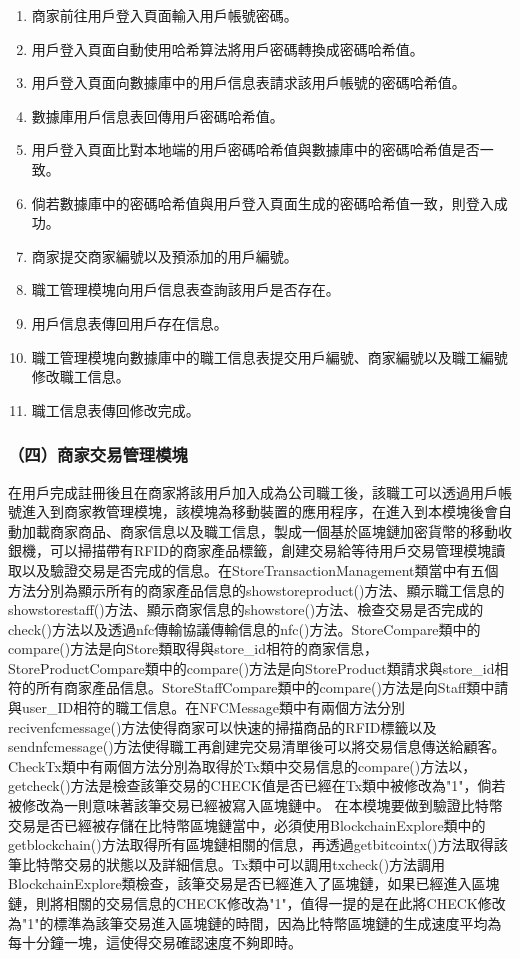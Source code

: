 	\begin{enumerate}
	\item 商家前往用戶登入頁面輸入用戶帳號密碼。
	\item 用戶登入頁面自動使用哈希算法將用戶密碼轉換成密碼哈希值。
	\item 用戶登入頁面向數據庫中的用戶信息表請求該用戶帳號的密碼哈希值。
	\item 數據庫用戶信息表回傳用戶密碼哈希值。
	\item 用戶登入頁面比對本地端的用戶密碼哈希值與數據庫中的密碼哈希值是否一致。
	\item 倘若數據庫中的密碼哈希值與用戶登入頁面生成的密碼哈希值一致，則登入成功。
	\item 商家提交商家編號以及預添加的用戶編號。
	\item 職工管理模塊向用戶信息表查詢該用戶是否存在。
	\item 用戶信息表傳回用戶存在信息。
	\item 職工管理模塊向數據庫中的職工信息表提交用戶編號、商家編號以及職工編號修改職工信息。
	\item 職工信息表傳回修改完成。
	\end{enumerate}

\subsubsection{（四）商家交易管理模塊}
在用戶完成註冊後且在商家將該用戶加入成為公司職工後，該職工可以透過用戶帳號進入到商家教管理模塊，該模塊為移動裝置的應用程序，在進入到本模塊後會自動加載商家商品、商家信息以及職工信息，製成一個基於區塊鏈加密貨幣的移動收銀機，可以掃描帶有RFID的商家產品標籤，創建交易給等待用戶交易管理模塊讀取以及驗證交易是否完成的信息。在StoreTransactionManagement類當中有五個方法分別為顯示所有的商家產品信息的showstoreproduct()方法、顯示職工信息的showstorestaff()方法、顯示商家信息的showstore()方法、檢查交易是否完成的check()方法以及透過nfc傳輸協議傳輸信息的nfc()方法。StoreCompare類中的compare()方法是向Store類取得與store\_id相符的商家信息，StoreProductCompare類中的compare()方法是向StoreProduct類請求與store\_id相符的所有商家產品信息。StoreStaffCompare類中的compare()方法是向Staff類中請與user\_ID相符的職工信息。在NFCMessage類中有兩個方法分別recivenfcmessage()方法使得商家可以快速的掃描商品的RFID標籤以及sendnfcmessage()方法使得職工再創建完交易清單後可以將交易信息傳送給顧客。CheckTx類中有兩個方法分別為取得於Tx類中交易信息的compare()方法以，getcheck()方法是檢查該筆交易的CHECK值是否已經在Tx類中被修改為"1"，倘若被修改為一則意味著該筆交易已經被寫入區塊鏈中。
在本模塊要做到驗證比特幣交易是否已經被存儲在比特幣區塊鏈當中，必須使用BlockchainExplore類中的getblockchain()方法取得所有區塊鏈相關的信息，再透過getbitcointx()方法取得該筆比特幣交易的狀態以及詳細信息。Tx類中可以調用txcheck()方法調用BlockchainExplore類檢查，該筆交易是否已經進入了區塊鏈，如果已經進入區塊鏈，則將相關的交易信息的CHECK修改為"1"，值得一提的是在此將CHECK修改為"1"的標準為該筆交易進入區塊鏈的時間，因為比特幣區塊鏈的生成速度平均為每十分鐘一塊，這使得交易確認速度不夠即時。

